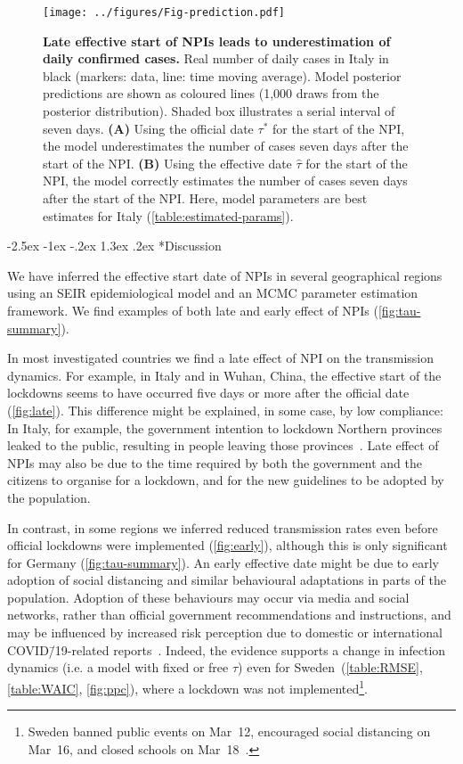 \documentclass[12pt]{extarticle}
\makeatletter
\renewcommand\section{\@startsection {section}{1}{\z@}%
     {-2.5ex \@plus -1ex \@minus -.2ex}%
     {1.3ex \@plus.2ex}%
    {\Large\bfseries}}
\makeatother
\begin{document}
\begin{figure}[h]
    \centering
	\texttt{[image: ../figures/Fig-prediction.pdf]}
    \caption{
    \textbf{Late effective start of NPIs leads to underestimation of daily confirmed cases.}
    Real number of daily cases in Italy in black (markers: data, line: time moving average). 
    Model posterior predictions are shown as coloured lines (1,000 draws from the posterior distribution). 
    Shaded box illustrates a serial interval of seven days.
    \textbf{(A)} Using the official date $\tau^*$ for the start of the NPI,  the model underestimates the number of cases seven days after the start of the NPI.
    \textbf{(B)} Using the effective date $\hat{\tau}$ for the start of the NPI,  the model correctly estimates the number of cases seven days after the start of the NPI.
    Here, model parameters are best estimates for Italy (\autoref{table:estimated-params}).
    } 
    \label{fig:prediction}
\end{figure}



\pagebreak
\section*{Discussion}

We have inferred the effective start date of NPIs in several geographical regions using an SEIR epidemiological model and an MCMC parameter estimation framework.
We find examples of both late and early effect of NPIs (\autoref{fig:tau-summary}).

In most investigated countries we find a late effect of NPI on the transmission dynamics.
For example, in Italy and in Wuhan, China, the effective start of the lockdowns seems to have occurred five days or more after the official date (\autoref{fig:late}).
This difference might be explained, in some case, by low compliance: In Italy, for example, the government intention to lockdown Northern provinces leaked to the public, resulting in people leaving those provinces~\citep{Gatto2020}.
Late effect of NPIs may also be due to the time required by both the government and the citizens to organise for a lockdown, and for the new guidelines to be adopted by the population.
 
In contrast, in some regions we inferred reduced transmission rates even before official lockdowns were implemented (\autoref{fig:early}), although this is only significant for Germany (\autoref{fig:tau-summary}).
An early effective date might be due to early adoption of social distancing and similar behavioural adaptations in parts of the population.
Adoption of these behaviours may occur via media and social networks, rather than official government recommendations and instructions, and may be influenced by increased risk perception due to domestic or international COVID\=/19-related reports~\citep{Arthur2020}.
Indeed, the evidence supports a change in infection dynamics (i.e. a model with fixed or free $\tau$) even for Sweden~(\autoref{table:RMSE}, \autoref{table:WAIC}, \autoref{fig:ppc}), where a lockdown was not implemented\footnote{Sweden banned public events on Mar~12, encouraged social distancing on Mar~16, and closed schools on Mar~18~\citep{Flaxman2020}.}.
\end{document}
